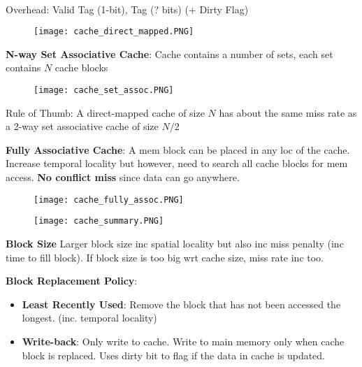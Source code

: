 \documentclass[a4paper,landscape]{article}
\newcommand{\rnname}[1]{\textbf{#1}}
\begin{document}
\begin{multicols*}{4}
\begin{flatitemize}
\\Overhead: Valid Tag (1-bit), Tag (? bits) (+ Dirty Flag)
\vspace{-1em}
\begin{figure}[H]
  \texttt{[image: cache\_direct\_mapped.PNG]}
\end{figure}
\vspace{-1.5em}
\item \rnname{N-way Set Associative Cache}: Cache contains a number of sets, each set contains $N$ cache blocks
\vspace{-1em}
\begin{figure}[H]
  \texttt{[image: cache\_set\_assoc.PNG]}
\end{figure}
\vspace{-1.5em}
\item Rule of Thumb: A direct-mapped cache of size $N$ has about the same miss rate as a 2-way set associative cache of size $N/2$
\item \rnname{Fully Associative Cache}: A mem block can be placed in any loc of the cache. Increase temporal locality but however, need to search all cache blocks for mem access. \textbf{No conflict miss} since data can go anywhere.
\vspace{-1.5em}
\begin{figure}[H]
  \texttt{[image: cache\_fully\_assoc.PNG]}
\end{figure}
\vspace{-1.5em}
\vspace{-1em}
\begin{figure}[H]
  \texttt{[image: cache\_summary.PNG]}
\end{figure}
\vspace{-1.5em}
\item \rnname{Block Size} Larger block size inc spatial locality but also inc miss penalty (inc time to fill block). If block size is too big wrt cache size, miss rate inc too.

\item \rnname{Block Replacement Policy}:
\vspace{-0.5em}
\begin{itemize}
\item \textbf{Least Recently Used}: Remove the block that has not been accessed the longest. (inc. temporal locality)

\item \textbf{Write-back}: Only write to cache. Write to main memory only when cache block is replaced. Uses dirty bit to flag if the data in cache is updated.
\end{itemize}

\end{flatitemize}


\end{multicols*}
\end{document}

